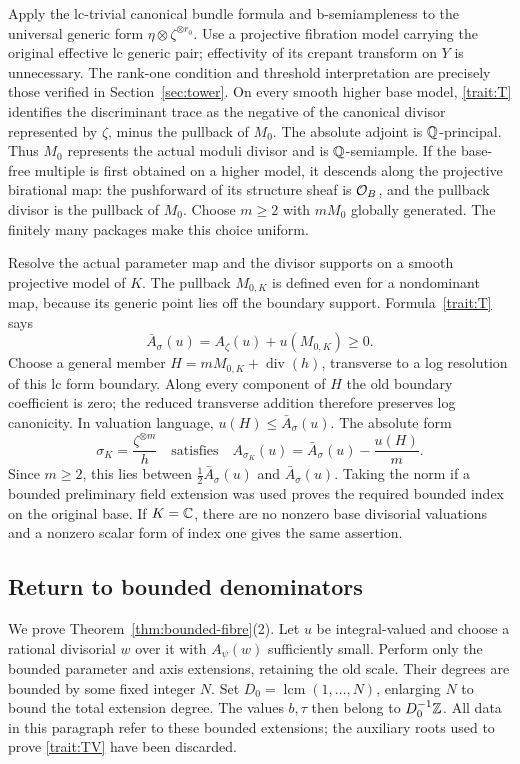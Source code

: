 Apply the lc-trivial canonical bundle formula and b-semiampleness
\cite{BFMT} to the universal generic form
\(\eta\otimes\zeta^{\otimes r_0}\).  Use a projective fibration model
carrying the original effective lc generic pair; effectivity of its
crepant transform on \(Y\) is unnecessary.  The rank-one condition and
threshold interpretation are precisely those verified in
Section~\ref{sec:tower}.  On every smooth higher base model,
\eqref{trait:T} identifies the discriminant trace as the negative of
the canonical divisor represented by \(\zeta\), minus the pullback of
\(M_0\).  The absolute adjoint is \(\mathbb Q\)-principal.  Thus \(M_0\)
represents the actual moduli divisor and is \(\mathbb Q\)-semiample.  If the
base-free multiple is first obtained on a higher model, it descends
along the projective birational map: the pushforward of its structure
sheaf is \(\mathcal O_B\), and the pullback divisor is the pullback of
\(M_0\).  Choose \(m\ge2\) with \(mM_0\) globally generated.  The
finitely many packages make this choice uniform.

Resolve the actual parameter map and the divisor supports on a smooth
projective model of \(K\).  The pullback \(M_{0,K}\) is defined even for
a nondominant map, because its generic point lies off the boundary
support.  Formula~\eqref{trait:T} says
\[
 \bar A_\sigma(u)=A_\zeta(u)+u(M_{0,K})\ge0.
\]
Choose a general member
\(H=mM_{0,K}+\operatorname{div}(h)\), transverse to a log resolution of
this lc form boundary.  Along every component of \(H\) the old
boundary coefficient is zero; the reduced transverse addition
therefore preserves log canonicity.  In valuation language,
\(u(H)\le\bar A_\sigma(u)\).  The absolute form
\begin{equation}
 \sigma_K=\frac{\zeta^{\otimes m}}{h}
 \quad\text{satisfies}\quad
 A_{\sigma_K}(u)=\bar A_\sigma(u)-\frac{u(H)}m.
 \label{bounded:base-form}
\end{equation}
Since \(m\ge2\), this lies between
\(\tfrac12\bar A_\sigma(u)\) and \(\bar A_\sigma(u)\).
Taking the norm if a bounded preliminary field extension was used
proves the required bounded index on the original base.  If \(K=\mathbb C\),
there are no nonzero base divisorial valuations and a nonzero scalar
form of index one gives the same assertion.

\subsection{Return to bounded denominators}

We prove Theorem~\ref{thm:bounded-fibre}(2).  Let \(u\)
be integral-valued and choose a rational divisorial
\(w\) over it with \(A_\psi(w)\) sufficiently small.
Perform only the bounded parameter and axis
extensions, retaining the old scale.  Their degrees
are bounded by some fixed integer \(N\).  Set
\(D_0=\operatorname{lcm}(1,\ldots,N)\), enlarging
\(N\) to bound the total extension degree.  The
values \(b,\tau\) then belong to
\(D_0^{-1}\mathbb Z\).  All data in this paragraph refer
to these bounded extensions; the auxiliary roots
used to prove \eqref{trait:TV} have been discarded.

